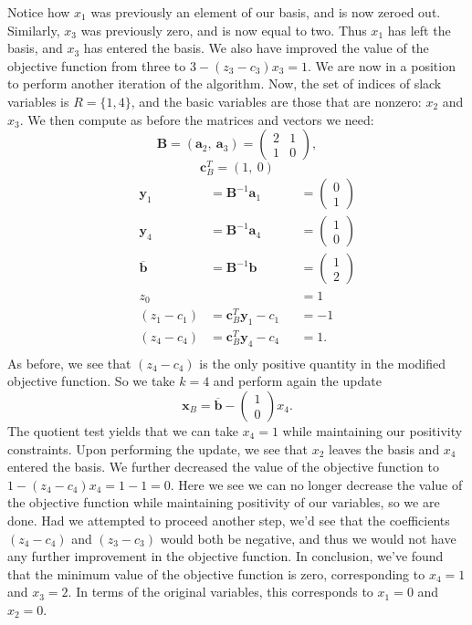 \documentclass[12pt,english]{article}
\begin{document}
Notice how $x_1$ was previously an element of our basis, and is now zeroed out.  Similarly, $x_3$ was previously zero, and is now equal to two.  Thus $x_1$ has left the basis, and $x_3$ has entered the basis.  We also have improved the value of the objective function from three to $3 - (z_3 - c_3) x_3 = 1$.  We are now in a position to perform another iteration of the algorithm.   Now, the set of indices of slack variables is $R = \{ 1, 4\}$, and the basic variables are those that are nonzero: $x_2$ and $x_3$.   We then compute as before the matrices and vectors we need:
$$
\mathbf{B} = \left( \mathbf{a}_2,~ \mathbf{a}_3\right) = 
\left(
\begin{array}{cc}
2	&	1	\\
1	&	0
\end{array}
\right),
$$
$$
\mathbf{c}_B^T = \left(1,~0\right)
$$
$$
\begin{aligned}
&&\mathbf{y}_1 	&= 	\mathbf{B}^{-1} \mathbf{a}_1 	&&= \left(\begin{array}{c} 0 \\ 1 \end{array}\right)	\\
&&\mathbf{y}_4 	&=	\mathbf{B}^{-1} \mathbf{a}_4 	&&= \left(\begin{array}{c} 1 \\ 0\end{array}\right)	\\
&&\overline{\mathbf{b}}	&=	\mathbf{B}^{-1} \mathbf{b} &&= \left(\begin{array}{c} 1 \\ 2 \end{array}\right) \\
&&z_0 & &&= 1 \\
&&(z_1 - c_1) &=	\mathbf{c}_B^T \mathbf{y}_1 - c_1 &&=-1\\
&&(z_4 - c_4) &=  \mathbf{c}_B^T \mathbf{y}_4 - c_4 &&=1.\\
\end{aligned}
$$
As before, we see that $(z_4 - c_4)$ is the only positive quantity in the modified objective function.  So we take $k=4$ and perform again the update
$$
\mathbf{x}_B = \overline{\mathbf{b}} - 
\left(
\begin{array}{c}
1\\
0
\end{array}
\right) x_4.
$$
The quotient test yields that we can take $x_4 =1$ while maintaining our positivity constraints.  Upon performing the update, we see that $x_2$ leaves the basis and $x_4$ entered the basis.  We further decreased the value of the objective function to $1 - (z_4 - c_4)x_4 = 1 - 1 = 0$.  Here we see we can no longer decrease the value of the objective function while maintaining positivity of our variables, so we are done.  Had we attempted to proceed another step, we'd see that the coefficients $(z_4 - c_4)$ and $(z_3 - c_3)$ would both be negative, and thus we would not have any further improvement in the objective function.  In conclusion, we've found that the minimum value of the objective function is zero, corresponding to $x_4 = 1$ and $x_3 = 2$.  In terms of the original variables, this corresponds to $x_1 = 0$ and $x_2 = 0$.
\end{document}
